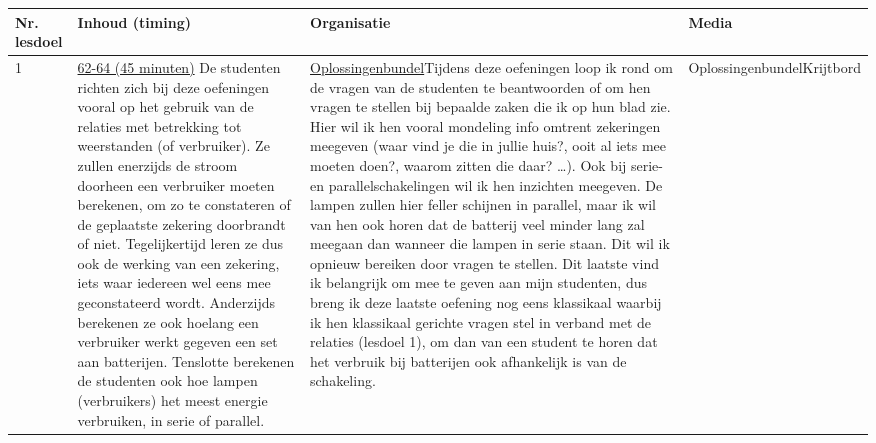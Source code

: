 \begin{landscape}
	
	\begin{tabularx}{1.56\textwidth}{|p{1.5cm}|p{6cm}|X|p{4cm}|}
		\hline
		\textbf{Nr. lesdoel } & \textbf{Inhoud (timing)}  & \textbf{Organisatie } & \textbf{Media } \\ \hline
		1\newline 3\newline 6\newline 7\newline 8\newline &\underline{62-64 (45 minuten)}\newline
		De studenten richten zich bij deze oefeningen vooral op het gebruik van de relaties met betrekking tot weerstanden (of verbruiker). Ze zullen enerzijds de stroom doorheen een verbruiker moeten berekenen, om zo te constateren of de geplaatste zekering doorbrandt of niet. Tegelijkertijd leren ze dus ook de werking van een zekering, iets waar iedereen wel eens mee geconstateerd wordt. Anderzijds berekenen ze ook hoelang een verbruiker werkt gegeven een set aan batterijen. Tenslotte berekenen de studenten ook hoe lampen (verbruikers) het meest energie verbruiken, in serie of parallel.  
		& \underline{Oplossingenbundel}\newline Tijdens deze oefeningen loop ik rond om de vragen van de studenten te beantwoorden of om hen vragen te stellen bij bepaalde zaken die ik op hun blad zie. Hier wil ik hen vooral mondeling info omtrent zekeringen meegeven (waar vind je die in jullie huis?, ooit al iets mee moeten doen?, waarom zitten die daar? \ldots). Ook bij serie- en parallelschakelingen wil ik hen inzichten meegeven. De lampen zullen hier feller schijnen in parallel, maar ik wil van hen ook horen dat de batterij veel minder lang zal meegaan dan wanneer die lampen in serie staan. Dit wil ik opnieuw bereiken door vragen te stellen. Dit laatste vind ik belangrijk om mee te geven aan mijn studenten, dus breng ik deze laatste oefening nog eens klassikaal waarbij ik hen klassikaal gerichte vragen stel in verband met de relaties (lesdoel 1), om dan van een student te horen dat het verbruik bij batterijen ook afhankelijk is van de schakeling. 
		& Oplossingenbundel\newline Krijtbord
		\\ \hline
	\end{tabularx}
	
	
	
	
	
	
	
	
\end{landscape}